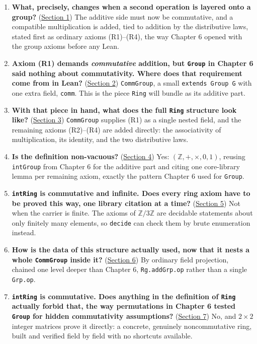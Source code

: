 \begin{enumerate}
\def\labelenumi{\arabic{enumi}.}
\tightlist
\item
  \textbf{What, precisely, changes when a second operation is layered onto a group?} (\hyperref[sec:08-rings:01-definition:1]{Section 1}) The additive side must now be commutative, and a compatible multiplication is added, tied to addition by the distributive laws, stated first as ordinary axioms (R1)--(R4), the way Chapter 6 opened with the group axioms before any Lean.
\item
  \textbf{Axiom (R1) demands \emph{commutative} addition, but \texttt{Group} in Chapter 6 said nothing about commutativity. Where does that requirement come from in Lean?} (\hyperref[sec:08-rings:02-comm-group:1]{Section 2}) \texttt{CommGroup}, a small \texttt{extends Group G} with one extra field, \texttt{comm}. This is the piece \texttt{Ring} will bundle as its additive part.
\item
  \textbf{With that piece in hand, what does the full \texttt{Ring} structure look like?} (\hyperref[sec:08-rings:03-ring:1]{Section 3}) \texttt{CommGroup} supplies (R1) as a single nested field, and the remaining axioms (R2)--(R4) are added directly: the associativity of multiplication, its identity, and the two distributive laws.
\item
  \textbf{Is the definition non-vacuous?} (\hyperref[sec:08-rings:04-integers-example:1]{Section 4}) Yes: \((\mathbb{Z}, +, \times, 0, 1)\), reusing \texttt{intGroup} from Chapter 6 for the additive part and citing one core-library lemma per remaining axiom, exactly the pattern Chapter 6 used for \texttt{Group}.
\item
  \textbf{\texttt{intRing} is commutative and infinite. Does every ring axiom have to be proved this way, one library citation at a time?} (\hyperref[sec:08-rings:05-finite-ring-example:1]{Section 5}) Not when the carrier is finite. The axioms of \(\mathbb{Z}/3\mathbb{Z}\) are decidable statements about only finitely many elements, so \texttt{decide} can check them by brute enumeration instead.
\item
  \textbf{How is the data of this structure actually used, now that it nests a whole \texttt{CommGroup} inside it?} (\hyperref[sec:08-rings:06-accessing-fields:1]{Section 6}) By ordinary field projection, chained one level deeper than Chapter 6, \texttt{Rg.addGrp.op} rather than a single \texttt{Grp.op}.
\item
  \textbf{\texttt{intRing} is commutative. Does anything in the definition of \texttt{Ring} actually forbid that, the way permutations in Chapter 6 tested \texttt{Group} for hidden commutativity assumptions?} (\hyperref[sec:08-rings:07-matrices:1]{Section 7}) No, and \(2\times 2\) integer matrices prove it directly: a concrete, genuinely noncommutative ring, built and verified field by field with no shortcuts available.
\end{enumerate}

